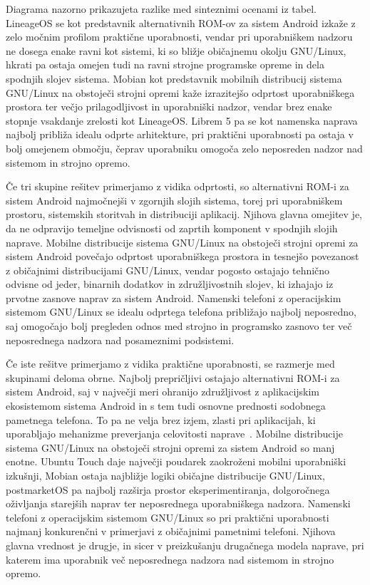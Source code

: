 \documentclass[a4paper,12pt,openright]{book}
\begin{document}

Diagrama nazorno prikazujeta razlike med sinteznimi ocenami iz tabel.
LineageOS se kot predstavnik alternativnih ROM-ov za sistem Android izkaže z zelo močnim profilom praktične uporabnosti, vendar pri uporabniškem nadzoru ne dosega enake ravni kot sistemi, ki so bližje običajnemu okolju GNU/Linux, hkrati pa ostaja omejen tudi na ravni strojne programske opreme in dela spodnjih slojev sistema.
Mobian kot predstavnik mobilnih distribucij sistema GNU/Linux na obstoječi strojni opremi kaže izrazitejšo odprtost uporabniškega prostora ter večjo prilagodljivost in uporabniški nadzor, vendar brez enake stopnje vsakdanje zrelosti kot LineageOS.
Librem 5 pa se kot namenska naprava najbolj približa idealu odprte arhitekture, pri praktični uporabnosti pa ostaja v bolj omejenem območju, čeprav uporabniku omogoča zelo neposreden nadzor nad sistemom in strojno opremo.

Če tri skupine rešitev primerjamo z vidika odprtosti, so alternativni ROM-i za sistem Android najmočnejši v zgornjih slojih sistema, torej pri uporabniškem prostoru, sistemskih storitvah in distribuciji aplikacij.
Njihova glavna omejitev je, da ne odpravijo temeljne odvisnosti od zaprtih komponent v spodnjih slojih naprave.
Mobilne distribucije sistema GNU/Linux na obstoječi strojni opremi za sistem Android povečajo odprtost uporabniškega prostora in tesnejšo povezanost z običajnimi distribucijami GNU/Linux, vendar pogosto ostajajo tehnično odvisne od jeder, binarnih dodatkov in združljivostnih slojev, ki izhajajo iz prvotne zasnove naprav za sistem Android.
Namenski telefoni z operacijskim sistemom GNU/Linux se idealu odprtega telefona približajo najbolj neposredno, saj omogočajo bolj pregleden odnos med strojno in programsko zasnovo ter več neposrednega nadzora nad posameznimi podsistemi.

Če iste rešitve primerjamo z vidika praktične uporabnosti, se razmerje med skupinami deloma obrne.
Najbolj prepričljivi ostajajo alternativni ROM-i za sistem Android, saj v največji meri ohranijo združljivost z aplikacijskim ekosistemom sistema Android in s tem tudi osnovne prednosti sodobnega pametnega telefona.
To pa ne velja brez izjem, zlasti pri aplikacijah, ki uporabljajo mehanizme preverjanja celovitosti naprave~\cite{play_integrity_overview}.
Mobilne distribucije sistema GNU/Linux na obstoječi strojni opremi za sistem Android so manj enotne.
Ubuntu Touch daje največji poudarek zaokroženi mobilni uporabniški izkušnji, Mobian ostaja najbližje logiki običajne distribucije GNU/Linux, postmarketOS pa najbolj razširja prostor eksperimentiranja, dolgoročnega oživljanja starejših naprav ter neposrednega uporabniškega nadzora.
Namenski telefoni z operacijskim sistemom GNU/Linux so pri praktični uporabnosti najmanj konkurenčni v primerjavi z običajnimi pametnimi telefoni.
Njihova glavna vrednost je drugje, in sicer v preizkušanju drugačnega modela naprave, pri katerem ima uporabnik več neposrednega nadzora nad sistemom in strojno opremo.
\end{document}
